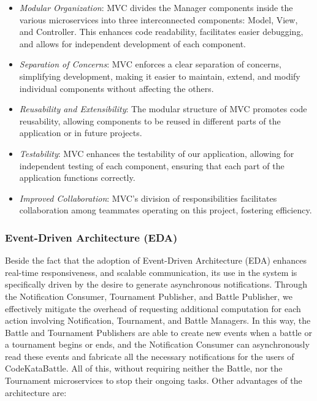 \begin{itemize}
    \item \textit{Modular Organization}: MVC divides the Manager components inside the various microservices into three interconnected components: Model, View, and Controller. This enhances code readability, facilitates easier debugging, and allows for independent development of each component.
  
    \item \textit{Separation of Concerns}: MVC enforces a clear separation of concerns, simplifying development, making it easier to maintain, extend, and modify individual components without affecting the others.
  
    \item \textit{Reusability and Extensibility}: The modular structure of MVC promotes code reusability, allowing components to be reused in different parts of the application or in future projects.
  
    \item \textit{Testability}: MVC enhances the testability of our application, allowing for independent testing of each component, ensuring that each part of the application functions correctly.
  
    \item \textit{Improved Collaboration}: MVC's division of responsibilities facilitates collaboration among teammates operating on this project, fostering efficiency.
\end{itemize}

\subsubsection*{Event-Driven Architecture (EDA)}

Beside the fact that the adoption of Event-Driven Architecture (EDA) enhances real-time responsiveness, and scalable communication, its use in the \app system is specifically driven by the desire to generate asynchronous notifications. Through the Notification Consumer, Tournament Publisher, and Battle Publisher, we effectively mitigate the overhead of requesting additional computation for each action involving Notification, Tournament, and Battle Managers. 
In this way, the Battle and Tournament Publishers are able to create new events when a battle or a tournament begins or ends, and the Notification Consumer can asynchronously read these events and fabricate all the necessary notifications for the users of CodeKataBattle. All of this, without requiring neither the Battle, nor the Tournament microservices to stop their ongoing tasks.
Other advantages of the architecture are:

